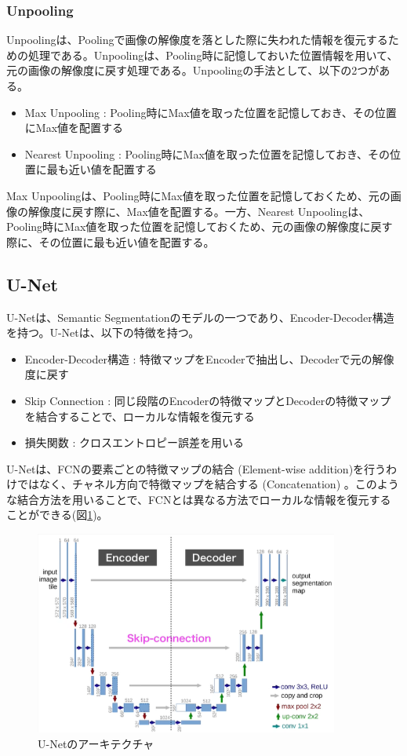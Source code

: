 \documentclass{ltjsarticle}
\begin{document}
\subsubsection{Unpooling}
Unpoolingは、Poolingで画像の解像度を落とした際に失われた情報を復元するための処理である。Unpoolingは、Pooling時に記憶しておいた位置情報を用いて、元の画像の解像度に戻す処理である。Unpoolingの手法として、以下の2つがある。
\begin{itemize}
  \item Max Unpooling : Pooling時にMax値を取った位置を記憶しておき、その位置にMax値を配置する
  \item Nearest Unpooling : Pooling時にMax値を取った位置を記憶しておき、その位置に最も近い値を配置する
\end{itemize}
Max Unpoolingは、Pooling時にMax値を取った位置を記憶しておくため、元の画像の解像度に戻す際に、Max値を配置する。一方、Nearest Unpoolingは、Pooling時にMax値を取った位置を記憶しておくため、元の画像の解像度に戻す際に、その位置に最も近い値を配置する。

\subsection{U-Net}
U-Netは、Semantic Segmentationのモデルの一つであり、Encoder-Decoder構造を持つ。U-Netは、以下の特徴を持つ。
\begin{itemize}
  \item Encoder-Decoder構造 : 特徴マップをEncoderで抽出し、Decoderで元の解像度に戻す
  \item Skip Connection : 同じ段階のEncoderの特徴マップとDecoderの特徴マップを結合することで、ローカルな情報を復元する
  \item 損失関数 : クロスエントロピー誤差を用いる
\end{itemize}
U-Netは、FCNの要素ごとの特徴マップの結合 (Element-wise addition)を行うわけではなく、チャネル方向で特徴マップを結合する (Concatenation) 。このような結合方法を用いることで、FCNとは異なる方法でローカルな情報を復元することができる(図\ref{fig:U-Net})。
\begin{figure}[htbp]
  \centering
  \includegraphics[width=10cm]{./capture/U-Net.png}
  \caption{U-Netのアーキテクチャ}
  \label{fig:U-Net}
\end{figure}
\end{document}
